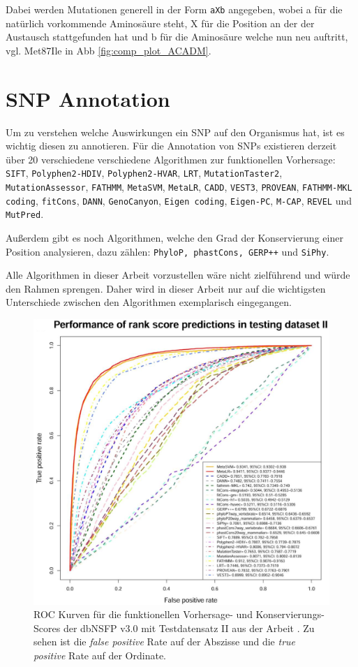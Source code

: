 Dabei werden Mutationen generell in der Form \texttt{aXb} angegeben, wobei a für die natürlich vorkommende Aminosäure steht, X für die Position an der der Austausch stattgefunden hat und b für die Aminosäure welche nun neu auftritt, vgl. Met87Ile in \ac{Abb} \ref{fig:comp_plot_ACADM}.


\section{SNP Annotation}
\begin{sloppypar}
Um zu verstehen welche Auswirkungen ein \ac{SNP} auf den Organismus hat, ist es wichtig diesen zu annotieren. 
Für die Annotation von \ac{SNP}s existieren derzeit über 20 verschiedene verschiedene Algorithmen zur funktionellen Vorhersage: \texttt{SIFT}, \texttt{Polyphen2-HDIV}, \texttt{Polyphen2-HVAR}, \texttt{LRT}, \texttt{MutationTaster2}, \texttt{MutationAssessor}, \texttt{FATHMM}, \texttt{MetaSVM}, \texttt{MetaLR}, \texttt{CADD}, \texttt{VEST3}, \texttt{PROVEAN}, \texttt{FATHMM-MKL coding}, \texttt{fitCons}, \texttt{DANN}, \texttt{GenoCanyon}, \texttt{Eigen coding}, \texttt{Eigen-PC}, \texttt{M-CAP}, \texttt{REVEL} und \texttt{MutPred}. 
\end{sloppypar}
Außerdem gibt es noch Algorithmen, welche den Grad der Konservierung einer Position analysieren, dazu zählen: \texttt{PhyloP, phastCons, GERP++} und \texttt{SiPhy}.

Alle Algorithmen in dieser Arbeit vorzustellen wäre nicht zielführend und würde den Rahmen sprengen. Daher wird in dieser Arbeit nur auf die wichtigsten Unterschiede zwischen den Algorithmen exemplarisch eingegangen. 

\begin{figure}
\centering
\includegraphics[width=.95\textwidth]{images/compared_prediction_scores.png}
\caption{\ac{ROC} Kurven für die funktionellen Vorhersage- und Konservierungs- Scores der dbNSFP v3.0 mit Testdatensatz II aus der Arbeit \cite{Liu.2016}. Zu sehen ist die \emph{false positive} Rate auf der Abszisse und die \emph{true positive} Rate auf der Ordinate.}
\label{fig:comp_scores}
\end{figure}

